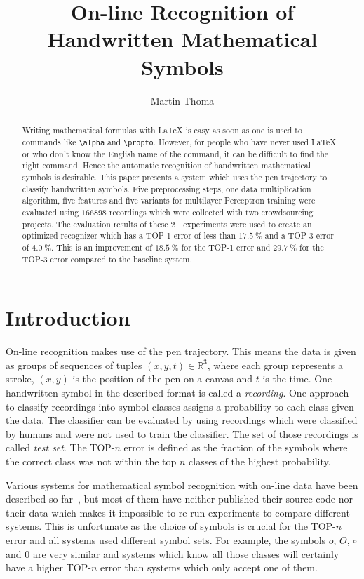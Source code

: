 \documentclass[9pt,technote]{IEEEtran}
\title{On-line Recognition of Handwritten Mathematical Symbols}
\author{Martin Thoma}
\begin{document}
\maketitle
\begin{abstract}
Writing mathematical formulas with \LaTeX{} is easy as soon as one is used to
commands like \verb+\alpha+ and \verb+\propto+. However, for people who have
never used \LaTeX{} or who don't know the English name of the command, it can
be difficult to find the right command. Hence the automatic recognition of
handwritten mathematical symbols is desirable. This paper presents a system
which uses the pen trajectory to classify handwritten symbols. Five
preprocessing steps, one data multiplication algorithm, five features and five
variants for multilayer Perceptron training were evaluated using $\num{166898}$
recordings which were collected with two crowdsourcing projects. The evaluation
results of these 21~experiments were used to create an optimized recognizer
which has a TOP-1 error of less than $\SI{17.5}{\percent}$ and a TOP-3 error of
$\SI{4.0}{\percent}$. This is an improvement of $\SI{18.5}{\percent}$ for the
TOP-1 error and $\SI{29.7}{\percent}$ for the TOP-3 error compared to the
baseline system.
\end{abstract}

\section{Introduction}
On-line recognition makes use of the pen trajectory. This means the data is
given as groups of sequences of tuples $(x, y, t) \in \mathbb{R}^3$, where each
group represents a stroke, $(x, y)$ is the position of the pen on a canvas and
$t$ is the time. One handwritten symbol in the described format is called a
\textit{recording}. One approach to classify recordings into symbol classes
assigns a probability to each class given the data. The classifier can be
evaluated by using recordings which were classified by humans and were not used
to train the classifier. The set of those recordings is called \textit{test
set}. The TOP-$n$ error is defined as the fraction of the symbols where
the correct class was not within the top $n$ classes of the highest
probability.

Various systems for mathematical symbol recognition with on-line data have been
described so far~\cite{Kosmala98,Mouchere2013}, but most of them have neither
published their source code nor their data which makes it impossible to re-run
experiments to compare different systems. This is unfortunate as the choice of
symbols is crucial for the TOP-$n$ error and all systems used different symbol
sets. For example, the symbols $o$, $O$, $\circ$ and $0$ are very similar and
systems which know all those classes will certainly have a higher TOP-$n$ error
than systems which only accept one of them.
\end{document}
